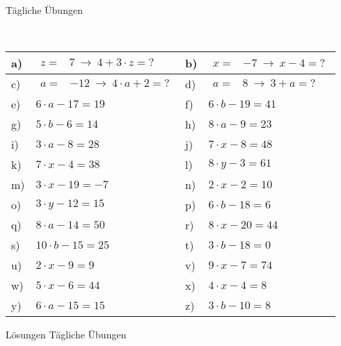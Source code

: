 \documentclass[12pt]{article}
\begin{document}
\centerline{{\Large Tägliche Übungen}} 
\vspace{1cm}
\noindent \\


\begin{xltabular}{\textwidth}{|C{0.75cm}|X|C{0.75cm}|X|}
\hline
a)&$\begin{aligned}
 z=&7~ \rightarrow ~ 4 + 3 \cdot z=?
\end{aligned}$
&
b)&$\begin{aligned}
 x=&-7~ \rightarrow ~ x - 4=?
\end{aligned}$
\\\hline
c)&$\begin{aligned}
 a=&-12~ \rightarrow ~ 4 \cdot a + 2=?
\end{aligned}$
&
d)&$\begin{aligned}
 a=&8~ \rightarrow ~ 3 + a=?
\end{aligned}$
\\\hline
e)&$6\cdot a-17=19$
&
f)&$6\cdot b-19=41$
\\\hline
g)&$5\cdot b-6=14$
&
h)&$8\cdot a-9=23$
\\\hline
i)&$3\cdot a-8=28$
&
j)&$7\cdot x-8=48$
\\\hline
k)&$7\cdot x-4=38$
&
l)&$8\cdot y-3=61$
\\\hline
m)&$3\cdot x-19=-7$
&
n)&$2\cdot x-2=10$
\\\hline
o)&$3\cdot y-12=15$
&
p)&$6\cdot b-18=6$
\\\hline
q)&$8\cdot a-14=50$
&
r)&$8\cdot x-20=44$
\\\hline
s)&$10\cdot b-15=25$
&
t)&$3\cdot b-18=0$
\\\hline
u)&$2\cdot x-9=9$
&
v)&$9\cdot x-7=74$
\\\hline
w)&$5\cdot x-6=44$
&
x)&$4\cdot x-4=8$
\\\hline
y)&$6\cdot a-15=15$
&
z)&$3\cdot b-10=8$
\\\hline
\end{xltabular}
\vspace{0.5cm}
\newpage
{}
\centerline{{\large Lösungen Tägliche Übungen}} 
\vspace{0.5cm}
\end{document}
